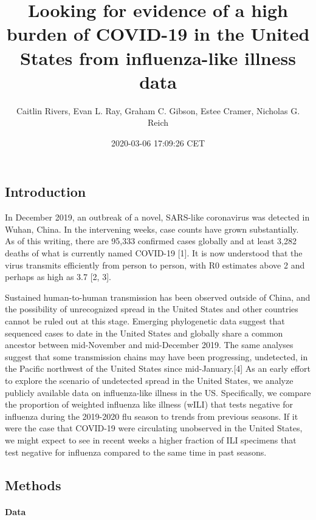 \documentclass[]{article}
\title{Looking for evidence of a high burden of COVID-19 in the United States
from influenza-like illness data}
\author{Caitlin Rivers, Evan L. Ray, Graham C. Gibson, Estee Cramer, Nicholas G.
Reich}
\date{2020-03-06 17:09:26 CET}
\let\oldparagraph\paragraph
\renewcommand{\paragraph}[1]{\oldparagraph{#1}\mbox{}}
\begin{document}
\maketitle

\hypertarget{introduction}{%
\subsection{Introduction}\label{introduction}}

In December 2019, an outbreak of a novel, SARS-like coronavirus was
detected in Wuhan, China. In the intervening weeks, case counts have
grown substantially. As of this writing, there are 95,333 confirmed
cases globally and at least 3,282 deaths of what is currently named
COVID-19 {[}1{]}. It is now understood that the virus transmits
efficiently from person to person, with R0 estimates above 2 and perhaps
as high as 3.7 {[}2, 3{]}.

Sustained human-to-human transmission has been observed outside of
China, and the possibility of unrecognized spread in the United States
and other countries cannot be ruled out at this stage. Emerging
phylogenetic data suggest that sequenced cases to date in the United
States and globally share a common ancestor between mid-November and
mid-December 2019. The same analyses suggest that some transmission
chains may have been progressing, undetected, in the Pacific northwest
of the United States since mid-January.{[}4{]} As an early effort to
explore the scenario of undetected spread in the United States, we
analyze publicly available data on influenza-like illness in the US.
Specifically, we compare the proportion of weighted influenza like
illness (wILI) that tests negative for influenza during the 2019-2020
flu season to trends from previous seasons. If it were the case that
COVID-19 were circulating unobserved in the United States, we might
expect to see in recent weeks a higher fraction of ILI specimens that
test negative for influenza compared to the same time in past seasons.

\hypertarget{methods}{%
\subsection{Methods}\label{methods}}

\hypertarget{data}{%
\paragraph{Data}\label{data}}
\end{document}
